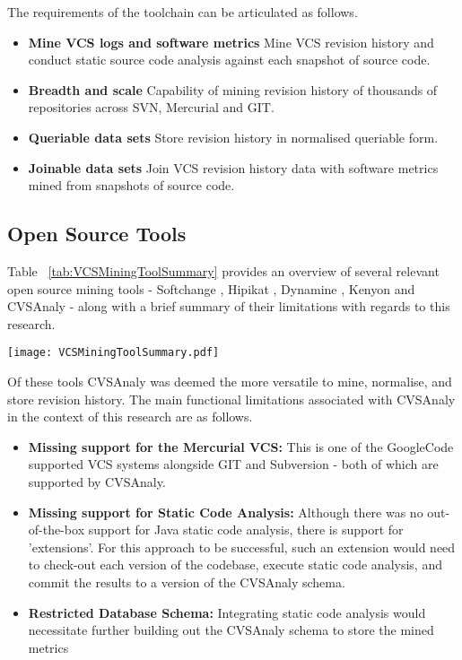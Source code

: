 The requirements of the toolchain can be articulated as follows.
\begin{itemize}
\item \textbf{Mine VCS logs and software metrics} Mine VCS revision history and conduct static source code analysis against each snapshot of source code.
\item \textbf{Breadth and scale} Capability of mining revision history of thousands of repositories across SVN, Mercurial and GIT.
\item \textbf{Queriable data sets} Store revision history in normalised queriable form.
\item \textbf{Joinable data sets} Join VCS revision history data with software metrics mined from snapshots of source code.
\end{itemize}

\subsection{Open Source Tools}
Table ~\ref{tab:VCSMiningToolSummary} provides an overview of several relevant open source mining tools - Softchange \cite{german2004mining}, Hipikat \cite{vcubranic2003hipikat}, Dynamine \cite{livshits2005dynamine}, Kenyon \cite{bevan2005facilitating} and CVSAnaly \cite{robles2004remote} - along with a brief summary of their limitations with regards to this research.

\begin{table}
\centering 
{}
\begin{tabular}
 \centering 
 \texttt{[image: VCSMiningToolSummary.pdf]}
 \label{tab:VCSMiningToolSummary}
\end{tabular}
\end{table}

Of these tools CVSAnaly was deemed the more versatile to mine, normalise, and store revision history. The main functional limitations associated with CVSAnaly in the context of this research are as follows.

\begin{itemize}
\item \textbf{Missing support for the Mercurial VCS:} This is one of the GoogleCode supported VCS systems alongside GIT and Subversion - both of which are supported by CVSAnaly.
\item \textbf{Missing support for Static Code Analysis:} Although there was no out-of-the-box support for Java static code analysis, there is support for 'extensions'. For this approach to be successful, such an extension would need to check-out each version of the codebase, execute static code analysis, and commit the results to a version of the CVSAnaly schema.
\item \textbf{Restricted Database Schema:} Integrating static code analysis would necessitate further building out the CVSAnaly schema to store the mined metrics 
\end{itemize}

